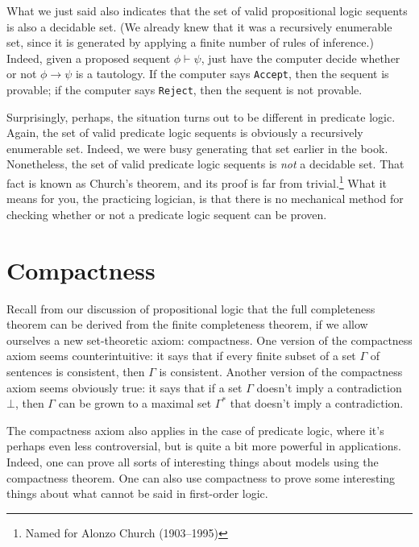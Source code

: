 What we just said also indicates that the set of valid propositional
logic sequents is also a decidable set.  (We already knew that it was
a recursively enumerable set, since it is generated by applying a
finite number of rules of inference.)  Indeed, given a proposed
sequent $\phi\vdash\psi$, just have the computer decide whether or not
$\phi\to\psi$ is a tautology.  If the computer says \texttt{Accept},
then the sequent is provable; if the computer says \texttt{Reject},
then the sequent is not provable.

Surprisingly, perhaps, the situation turns out to be different in
predicate logic.  Again, the set of valid predicate logic sequents is
obviously a recursively enumerable set.  Indeed, we were busy
generating that set earlier in the book.  Nonetheless, the set of
valid predicate logic sequents is {\it not} a decidable set.  That
fact is known as Church's theorem, and its proof is far from
trivial.\footnote{Named for Alonzo Church (1903--1995)} What it means
for you, the practicing logician, is that there is no mechanical
method for checking whether or not a predicate logic sequent can be
proven.



\section{Compactness}

Recall from our discussion of propositional logic that the full
completeness theorem can be derived from the finite completeness
theorem, if we allow ourselves a new set-theoretic axiom: compactness.
One version of the compactness axiom seems counterintuitive: it says
that if every finite subset of a set $\Gamma$ of sentences is
consistent, then $\Gamma$ is consistent.  Another version of the
compactness axiom seems obviously true: it says that if a set $\Gamma$
doesn't imply a contradiction $\bot$, then $\Gamma$ can be grown to a
maximal set $\Gamma ^*$ that doesn't imply a contradiction.

The compactness axiom also applies in the case of predicate logic,
where it's perhaps even less controversial, but is quite a bit more
powerful in applications.  Indeed, one can prove all sorts of
interesting things about models using the compactness theorem.  One
can also use compactness to prove some interesting things about what
cannot be said in first-order logic.


